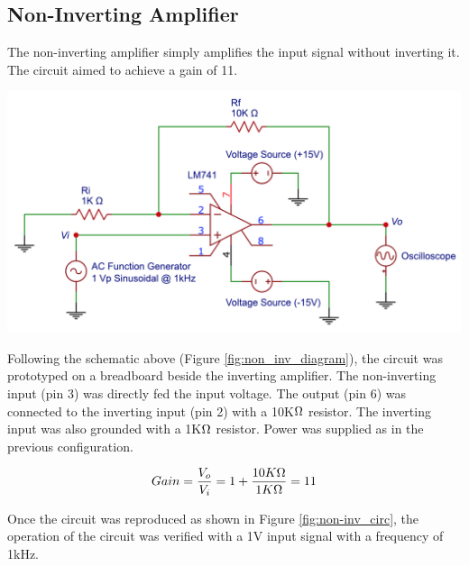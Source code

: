 \documentclass[journal]{IEEEtran}
\begin{document}
                                
\subsection{Non-Inverting Amplifier}
\noindent The non-inverting amplifier simply amplifies the input signal without inverting it. The circuit aimed to achieve a gain of 11.

\begingroup
    \centering
    \medskip
    \includegraphics[width=\columnwidth]{images/lab7_non-inverting.png}
    \label{fig:non_inv_diagram}
    \medskip
\endgroup

\noindent Following the schematic above (Figure \ref{fig:non_inv_diagram}), the circuit was prototyped on a breadboard beside the inverting amplifier. The non-inverting input (pin 3) was directly fed the input voltage. The output (pin 6) was connected to the inverting input (pin 2) with a 10K$\ohm$ resistor. The inverting input was also grounded with a 1K$\ohm$ resistor. Power was supplied as in the previous configuration.

\begin{equation}
Gain = \frac{V_o}{V_i} = 1 + \frac{10K \ohm}{1K \ohm} = 11
\label{eq:non-inverting}
\end{equation}

\noindent Once the circuit was reproduced as shown in  Figure \ref{fig:non-inv_circ}, the operation of the circuit was verified with a 1V input signal with a frequency of 1kHz.
\end{document}
